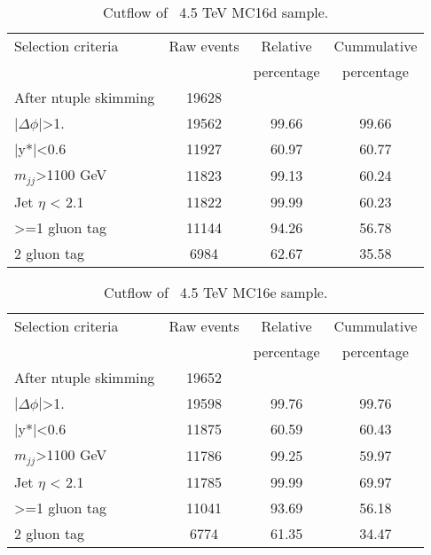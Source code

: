 \begin{table}[ht]
\begin{center}
\begin{tabular}{|l|c|c|c|}
\hline
Selection criteria & Raw events &  Relative & Cummulative \\
 & & percentage & percentage \\
\hline
After ntuple skimming & 19628 &  &  \\
$|\Delta\phi|$>1. & 19562 & 99.66 & 99.66 \\
|y*|<0.6 & 11927 & 60.97 & 60.77 \\
$m_{jj}$>1100 GeV & 11823 & 99.13 & 60.24 \\
Jet $\eta$ < 2.1 & 11822 & 99.99 & 60.23 \\
>=1 gluon tag & 11144 & 94.26 & 56.78 \\
2 gluon tag & 6984 & 62.67 & 35.58 \\
\hline
\end{tabular}
\end{center}
\caption{Cutflow of \Hprime\ 4.5 TeV MC16d sample.}
\end{table}

\begin{table}[ht]
\begin{center}
\begin{tabular}{|l|c|c|c|}
\hline
Selection criteria & Raw events &  Relative & Cummulative \\
 & & percentage & percentage \\
\hline
After ntuple skimming & 19652 &  &  \\
$|\Delta\phi|$>1. & 19598 & 99.76 & 99.76 \\
|y*|<0.6 & 11875 & 60.59 & 60.43 \\
$m_{jj}$>1100 GeV & 11786 & 99.25 & 59.97 \\
Jet $\eta$ < 2.1 & 11785 & 99.99 & 69.97 \\
>=1 gluon tag & 11041 & 93.69 & 56.18 \\
2 gluon tag & 6774 & 61.35 & 34.47 \\
\hline
\end{tabular}
\end{center}
\caption{Cutflow of \Hprime\ 4.5 TeV MC16e sample.}
\end{table}

